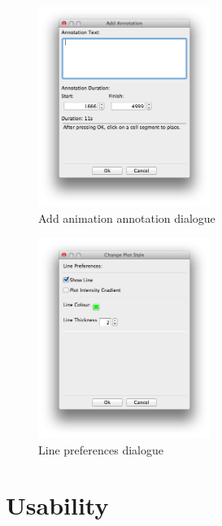 \begin{figure}[h!]
    \centering
    \includegraphics[width=0.5\textwidth]{images/add_annotation_dialogue.png}
    \caption{Add animation annotation dialogue}
    \label{fig:add_anime_annotation}
\end{figure}

\begin{figure}[h!]
    \centering
    \includegraphics[width=0.5\textwidth]{images/plot_preferences_dialogue.png}
    \caption{Line preferences dialogue}
    \label{fig:plot_prefs_dialogue}
\end{figure}



\section{Usability}


